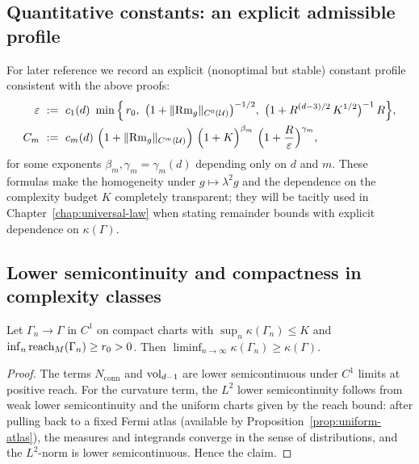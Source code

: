 \subsection{Quantitative constants: an explicit admissible profile}
\label{subsec:explicit-constants}

For later reference we record an explicit (nonoptimal but stable) constant profile consistent with the above proofs:
\begin{align*}
\varepsilon\ &:=\ c_1(d)\ \min\Big\{\, r_0,\ \big(1+\|{\rm Rm}_g\|_{C^0(\mathcal{U})}\big)^{-1/2},\ \big(1+ R^{(d-3)/2}\,K^{1/2}\big)^{-1}\,R \Big\},\\
C_m\ &:=\ c_m(d)\ \Big(1+\|{\rm Rm}_g\|_{C^m(\mathcal{U})}\Big)\ \Big(1+K\Big)^{\beta_m}\ \Big(1+\frac{R}{\varepsilon}\Big)^{\gamma_m},
\end{align*}
for some exponents $\beta_m,\gamma_m=\gamma_m(d)$ depending only on $d$ and $m$.
These formulas make the homogeneity under $g\mapsto \lambda^2 g$ and the dependence on the complexity budget $K$
completely transparent; they will be tacitly used in Chapter~\ref{chap:universal-law} when stating remainder bounds with explicit dependence on $\kappa(\Gamma)$.

\subsection{Lower semicontinuity and compactness in complexity classes}
\label{subsec:lsc-compact}

\begin{lemma}
\label{lem:lsc}
Let $\Gamma_n\to \Gamma$ in $C^1$ on compact charts with $\sup_n \kappa(\Gamma_n)\le K$
and $\inf_n \operatorname{reach}_M(\Gamma_n)\ge r_0>0$.
Then $\liminf_{n\to\infty}\kappa(\Gamma_n)\ge \kappa(\Gamma)$.
\end{lemma}

\begin{proof}
The terms $N_{\mathrm{conn}}$ and $\operatorname{vol}_{d-1}$ are lower semicontinuous under $C^1$ limits at positive reach.
For the curvature term, the $L^2$ lower semicontinuity follows from weak lower semicontinuity and the uniform charts given by the reach bound: after pulling back to a fixed Fermi atlas (available by Proposition~\ref{prop:uniform-atlas}), the measures and integrands converge in the sense of distributions, and the $L^2$-norm is lower semicontinuous. Hence the claim.
\end{proof}

